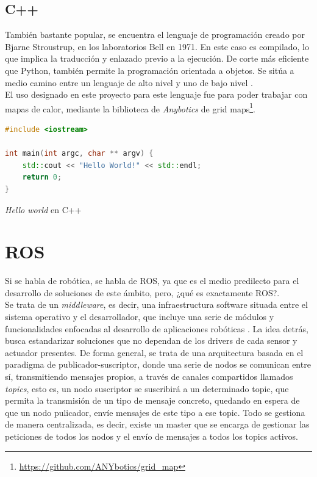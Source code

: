 \subsection{C++}
\label{subsec:cplusplus}

También bastante popular, se encuentra el lenguaje de programación creado por Bjarne Stroustrup, en los laboratorios Bell en 1971. En este caso es compilado, lo que implica la traducción y enlazado previo a la ejecución. De corte más eficiente que Python, también permite la programación orientada a objetos. Se sitúa a medio camino entre un lenguaje de alto nivel y uno de bajo nivel \cite{c-history}.\\

El uso designado en este proyecto para este lenguaje fue para poder trabajar con mapas de calor, mediante la biblioteca de \emph{Anybotics} de grid maps\footnote[1]{\url{https://github.com/ANYbotics/grid_map}}.

\begin{code}[H]
\begin{lstlisting}[language=C++]
#include <iostream>

int main(int argc, char ** argv) {
    std::cout << "Hello World!" << std::endl;
    return 0;
}
\end{lstlisting}
\caption[Hello world en C++]{\emph{Hello world} en C++}
\label{cod:helloworld_cplusplus}
\end{code}

\section{\ac{ROS}}
\label{sec:ros}

Si se habla de robótica, se habla de \ac{ROS}, ya que es el medio predilecto para el desarrollo de soluciones de este ámbito, pero, ¿qué es exactamente \ac{ROS}?.\\

Se trata de un \emph{middleware}, es decir, una infraestructura software situada entre el sistema operativo y el desarrollador, que incluye una serie de módulos y funcionalidades enfocadas al desarrollo de aplicaciones robóticas \cite{middleware-def} \cite{ros-def}. La idea detrás, busca estandarizar soluciones que no dependan de los drivers de cada sensor y actuador presentes. De forma general, se trata de una arquitectura basada en el paradigma de publicador-suscriptor, donde una serie de nodos se comunican entre sí, transmitiendo mensajes propios, a través de canales compartidos llamados \emph{topics}, esto es, un nodo suscriptor se suscribirá a un determinado topic, que permita la transmisión de un tipo de mensaje concreto, quedando en espera de que un nodo pulicador, envíe mensajes de este tipo a ese topic. Todo se gestiona de manera centralizada, es decir, existe un master que se encarga de gestionar las peticiones de todos los nodos y el envío de mensajes a todos los topics activos.\\

